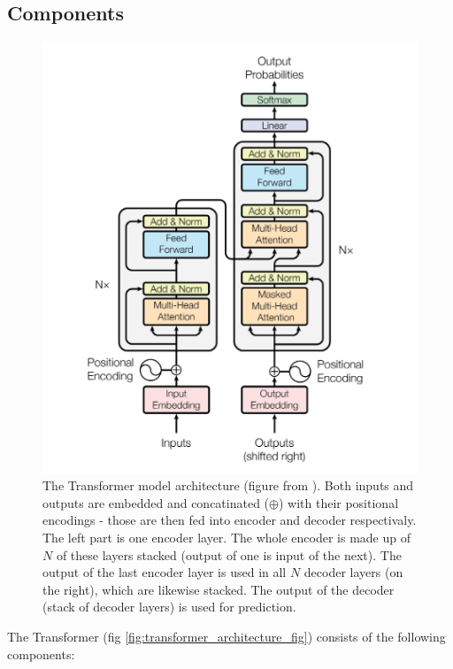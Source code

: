 \subsection{Components}

\begin{figure}[h!]
	\includegraphics[width=\linewidth]{"pictures/the-transformer-model-architecture.png"} %
	\caption{The Transformer model architecture (figure from \cite{attention_is_all_you_need}). Both inputs and outputs are embedded and concatinated (\(\oplus\)) with their positional encodings - those are then fed into encoder and decoder respectivaly. The left part is one encoder layer. The whole encoder is made up of \(N\) of these layers stacked (output of one is input of the next). The output of the last encoder layer is used in all \(N\) decoder layers (on the right), which are likewise stacked. The output of the decoder (stack of decoder layers) is used for prediction.}

	\label{fig:transformer_architecture_fig}
\end{figure}

The Transformer (fig \autoref{fig:transformer_architecture_fig}) consists of the following components:

